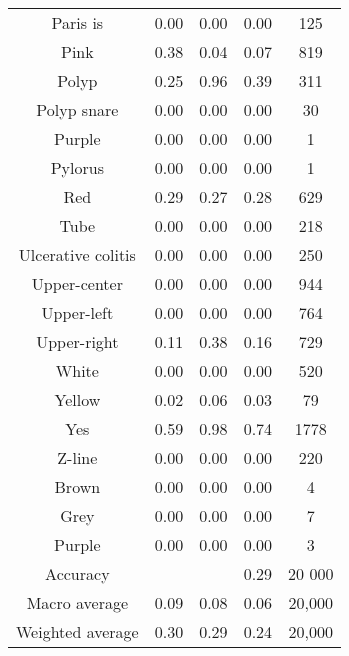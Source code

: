 \begin{center}
\begin{longtable}{|c|c|c|c|c|}
Paris is & 0.00 & 0.00 & 0.00 & 125 \\
Pink & 0.38 & 0.04 & 0.07 & 819 \\
Polyp & 0.25 & 0.96 & 0.39 & 311 \\
Polyp snare & 0.00 & 0.00 & 0.00 & 30 \\
Purple & 0.00 & 0.00 & 0.00 & 1 \\
Pylorus & 0.00 & 0.00 & 0.00 & 1 \\
Red & 0.29 & 0.27 & 0.28 & 629 \\
Tube & 0.00 & 0.00 & 0.00 & 218 \\
Ulcerative colitis & 0.00 & 0.00 & 0.00 & 250 \\
Upper-center & 0.00 & 0.00 & 0.00 & 944 \\
Upper-left & 0.00 & 0.00 & 0.00 & 764 \\
Upper-right & 0.11 & 0.38 & 0.16 & 729 \\
White & 0.00 & 0.00 & 0.00 & 520 \\
Yellow & 0.02 & 0.06 & 0.03 & 79 \\
Yes & 0.59 & 0.98 & 0.74 & 1778 \\
Z-line & 0.00 & 0.00 & 0.00 & 220 \\
Brown & 0.00 & 0.00 & 0.00 & 4 \\
Grey & 0.00 & 0.00 & 0.00 & 7 \\
Purple & 0.00 & 0.00 & 0.00 & 3 \\
\hline
Accuracy &  &  & 0.29 & 20 000 \\
Macro average & 0.09 & 0.08 & 0.06 & 20,000 \\
Weighted average & 0.30 & 0.29 & 0.24 & 20,000 \\

\end{longtable}
\end{center}